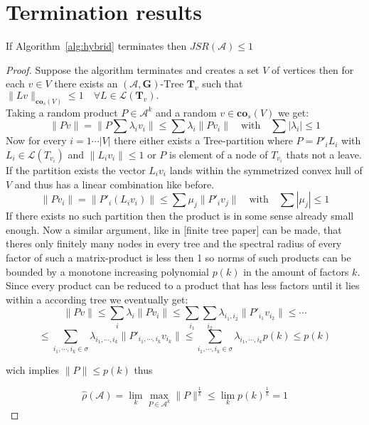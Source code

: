 \section{Termination results}

\begin{theorem}{}\label{thm:hybrid-found}
If Algorithm~\ref{alg:hybrid} terminates then $JSR(\mathcal{A}) \leq 1$
\end{theorem}

\begin{proof}
Suppose the algorithm terminates and creates a set $V$ of vertices then for each $v \in V$ there exists an $(\mathcal{A},\mathbf{G})\text{-Tree } \mathbf{T}_{v}$ such that $\lVert Lv \rVert_{\mathbf{co}_s (V)} \leq 1 \quad \forall L \in \mathcal{L}(\mathbf{T}_{v}).$ \\
Taking a random product $P \in \mathcal{A}^k$ and a random $v \in \mathbf{co}_s(V)$
we get:
$$\lVert Pv \rVert = \lVert P \sum \lambda_i v_i \rVert \leq \sum \lambda_i \lVert P v_i \rVert \quad \text{with} \quad \sum |\lambda_i| \leq 1$$
Now for every $i = 1 \cdots \lvert V \rvert$ there either exists a Tree-partition where $P = P'_i L_i $ with $L_i \in \mathcal{L}(T_{v_i})$ and $\lVert L_i v_i \rVert \leq 1$ or $P$ is element of a node of $T_{v_i}$ thats not a leave. If the partition exists the vector $L_iv_i$ lands within the symmetrized convex hull of $V$ and thus has a linear combination like before. \\
$$ \lVert P v_i \rVert = \lVert P'_i (L_i v_i) \rVert \leq \sum \mu_j \lVert P'_i v_j \rVert \quad \text{with} \quad \sum |\mu_j| \leq 1 $$
If there exists no such partition then the product is in some sense already small enough. Now a similar argument, like in [finite tree paper] can be made, that theres only finitely many nodes in every tree and the spectral radius of every factor of such a matrix-product is less then 1 so norms of such products can be bounded by a monotone increasing polynomial $p(k)$ in the amount of factors $k$. \\
Since every product can be reduced to a product that has less factors until it lies within a according tree we eventually get:
$$ \lVert Pv \rVert \leq \sum \limits_{i} \lambda_i \lVert P v_i \rVert \leq \sum\limits_{i_1}\sum\limits_{i_2}\lambda_{i_1,i_2} \lVert P'_{i_1} v_{i_2} \rVert \leq \cdots $$
$$  \leq \sum \limits_{i_1,\cdots,i_k \in \sigma} \lambda_{i_1,\cdots,i_k} \lVert P'_{i_1,\cdots,i_k}v_{i_k} \rVert \leq \sum \limits_{i_1,\cdots,i_k \in \sigma} \lambda_{i_1,\cdots,i_k} p(k) \leq p(k)$$

wich implies $\lVert P \rVert \leq p(k)$ thus

$$\hat{\rho}(\mathcal{A}) = \lim_k \max_{P \in \mathcal{A}^k} \lVert P \rVert ^{\frac{1}{k}} \leq \lim_k p(k) ^{\frac{1}{k}}  = 1$$
\end{proof}

